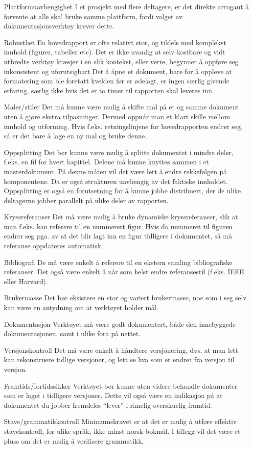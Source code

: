 \vspace{1em}
\begin{compactdesc}
\item [Plattformuavhengighet] I et prosjekt med flere deltagere, er det direkte arrogant å forvente at alle skal bruke samme plattform, fordi valget av dokumentasjonsverktøy krever dette.
\item [Robusthet] En hovedrapport er ofte relativt stor, og tildels med komplekst innhold (figurer, tabeller etc). Det er ikke uvanlig at selv kostbare og vidt utbredte verktøy kræsjer i en slik kontekst, eller verre, begynner å oppføre seg inkonsistent og uforutsigbart Det å åpne et dokument, bare for å oppleve at formatering som ble foretatt kvelden før er ødelagt, er ingen særlig givende erfaring, særlig ikke hvis det er to timer til rapporten skal leveres inn.
\item [Maler/stiler] Det må kunne være mulig å skifte mal på et og samme dokument uten å gjøre ekstra tilpasninger. Dermed oppnår man et klart skille mellom innhold og utforming. Hvis f.eks. retningslinjene for hovedrapporten endrer seg, så er det bare å lage en ny mal og bruke denne.
\item [Oppsplitting]Det bør kunne være mulig å splitte dokumentet i mindre deler, f.eks. en fil for hvert kapittel. Delene må kunne knyttes sammen i et masterdokument. På denne måten vil det være lett å endre rekkefølgen på komponentene. Da er også strukturen uavhengig av det faktiske innholdet. Oppsplitting er også en forutsetning for å kunne jobbe distribuert, der de ulike deltagerne jobber parallelt på ulike deler av rapporten.
\item [Kryssreferanser]Det må være mulig å bruke dynamiske kryssreferanser, slik at man f.eks. kan referere til en nummerert figur. Hvis da nummeret til figuren endrer seg pga. av at det blir lagt inn en figur tidligere i dokumentet, så må referanse oppdateres automatisk.
\item [Bibliografi]De må være enkelt å referere til en ekstern samling bibliografiske referanser. Det også være enkelt å når som helst endre referansestil (f.eks. IEEE eller Harvard).
\item [Brukermasse]Det bør eksistere en stor og variert brukermasse, noe som i seg selv kan være en antydning om at verktøyet holder mål.
\item [Dokumentasjon]Verktøyet må være godt dokumentert, både den innebyggede dokumentasjonen, samt i ulike fora på nettet.
\item [Versjonskontroll]Det må være enkelt å håndtere versjonering, dvs. at man lett kan rekonstruere tidlige versjoner, og lett se hva som er endret fra versjon til versjon.
\item [Framtids/fortidssikker]Verktøyet bør kunne uten videre behandle dokumenter som er laget i tidligere versjoner. Dette vil også være en indikasjon på at dokumentet du jobber fremdeles ``lever'' i rimelig overskuelig framtid. 
\item [Stave/grammatikkontroll] Minimumskravet er at det er mulig å utføre effektiv stavekontroll, for ulike språk, ikke minst norsk bokmål. I tillegg vil det være et pluss om det er mulig å verifisere grammatikk.
\end{compactdesc}


